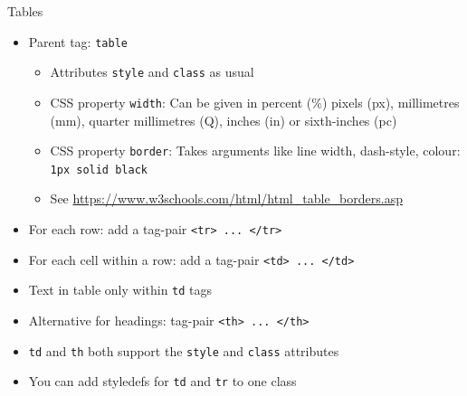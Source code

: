 
\begin{frame}{Tables}
%
\begin{itemize}
\item Parent tag: \texttt{table}
	\begin{itemize}
	\item Attributes \texttt{style} and \texttt{class} as usual
	\item CSS property \texttt{width}: Can be given in percent (\%) pixels (px), millimetres (mm), quarter millimetres (Q), inches (in) or sixth-inches (pc)
	\item CSS property \texttt{border}: Takes arguments like line width, dash-style, colour: \texttt{1px solid black}
	\item See \url{https://www.w3schools.com/html/html_table_borders.asp}
	\end{itemize}
\pause
\item For each row: add a tag-pair \texttt{<tr> ... </tr>}
\item For each cell within a row: add a tag-pair \texttt{<td> ... </td>}
\item Text in table only within \texttt{td} tags
\pause
\item Alternative for headings: tag-pair \texttt{<th> ... </th>}
\pause
\item \texttt{td} and \texttt{th} both support the \texttt{style} and \texttt{class} attributes
\item You can add styledefs for \texttt{td} and \texttt{tr} to one class
\end{itemize}
%
\end{frame}


